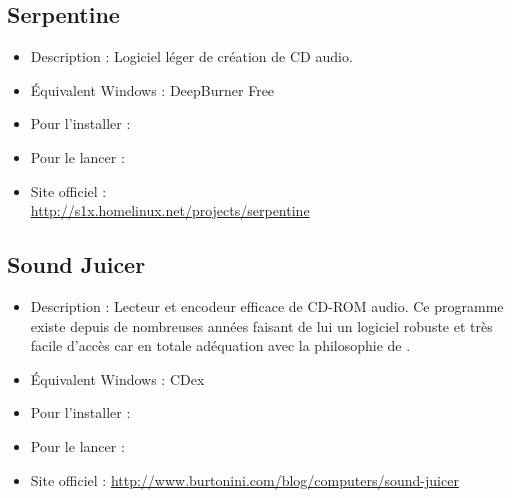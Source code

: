 \subsection{Serpentine}
\begin{itemize}
\begingroup
{}
\item Description : Logiciel léger de création de CD audio.{\par}
\item Équivalent Windows : DeepBurner Free{\par}
\item Pour l'installer : 
\item Pour le lancer : 
\item Site officiel :\\\url{http://s1x.homelinux.net/projects/serpentine}{\par}
\endgroup
\end{itemize}
\subsection{Sound Juicer}
\begin{itemize}
\begingroup
{}
\item Description : Lecteur et encodeur efficace de CD-ROM audio. Ce programme existe depuis de nombreuses années faisant de lui un logiciel robuste et très facile d'accès car en totale adéquation avec la philosophie de .{\par}
\item Équivalent Windows : CDex{\par}
\item Pour l'installer : 
\item Pour le lancer : 
\endgroup
\item Site officiel : \url{http://www.burtonini.com/blog/computers/sound-juicer}{\par}
\end{itemize}
